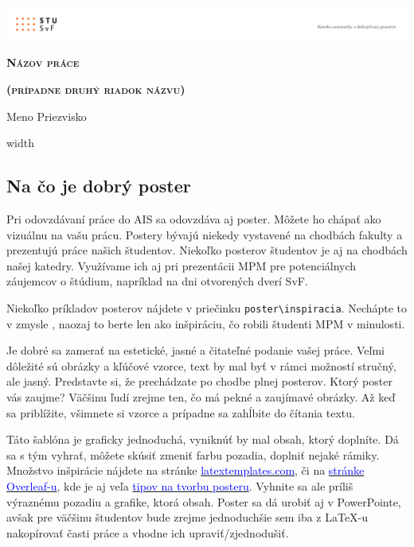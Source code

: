 \documentclass[portrait,a0]{a0poster}
\begin{document}
	\renewcommand{\baselinestretch}{1.5} %
	\fontsize{25pt}{20pt} %
	\selectfont
	
	\centerline{\includegraphics[width=\paperwidth]{header/header.pdf}}
	\centerline{\huge \textsc{\textbf{Názov práce}}}
	\centerline{\huge \textsc{\textbf{(prípadne druhý riadok názvu)}}}
	\vskip 1cm 
	\centerline{\Large Meno Priezvisko}
	\vskip 0.5cm
	\leaders\vrule width \linewidth\vskip 3pt

	\begin{multicols}{3} %

	\section*{Na čo je dobrý poster}
	
	Pri odovzdávaní práce do AIS sa odovzdáva aj poster. Môžete ho chápať ako vizuálnu  na vašu prácu. Postery bývajú niekedy vystavené na chodbách fakulty a prezentujú práce našich študentov. Niekoľko posterov študentov je aj na chodbách našej katedry. Využívame ich aj pri prezentácii MPM pre potenciálnych záujemcov o štúdium, napríklad na dni otvorených dverí SvF.
	
	Niekoľko príkladov posterov nájdete v priečinku \verb*|poster\inspiracia|. Nechápte to v zmysle , naozaj to berte len ako inšpiráciu, čo robili študenti MPM v minulosti.
	
	Je dobré sa zamerať na estetické, jasné a čitateľné podanie vašej práce. Veľmi dôležité sú obrázky a kľúčové vzorce, text by mal byť v rámci možností stručný, ale jasný. Predstavte si, že prechádzate po chodbe plnej posterov. Ktorý poster vás zaujme? Väčšinu ľudí zrejme ten, čo má pekné a zaujímavé obrázky. Až keď sa priblížite, všimnete si vzorce a prípadne sa zahĺbite do čítania textu.
	
	Táto šablóna je graficky jednoduchá, vyniknúť by mal obsah, ktorý doplníte. Dá sa s tým vyhrať, môžete skúsiť zmeniť farbu pozadia, doplniť nejaké rámiky. Množstvo inšpirácie nájdete na stránke \href{https://www.latextemplates.com/cat/conference-posters}{\textcolor{blue}{latextemplates.com}}, či na  \href{https://www.overleaf.com/gallery/tagged/poster}{\textcolor{blue}{stránke Overleaf-u}}, kde je aj veľa \href{https://www.overleaf.com/learn/latex/Posters}{\textcolor{blue}{tipov na tvorbu posteru}}. Vyhnite sa ale príliš výraznému pozadiu a grafike, ktorá  obsah. Poster sa dá urobiť aj v PowerPointe, avšak pre väčšinu študentov bude zrejme jednoduchšie sem iba z LaTeX-u nakopírovať časti práce a vhodne ich upraviť/zjednodušiť.
	

\end{multicols}
\end{document}
